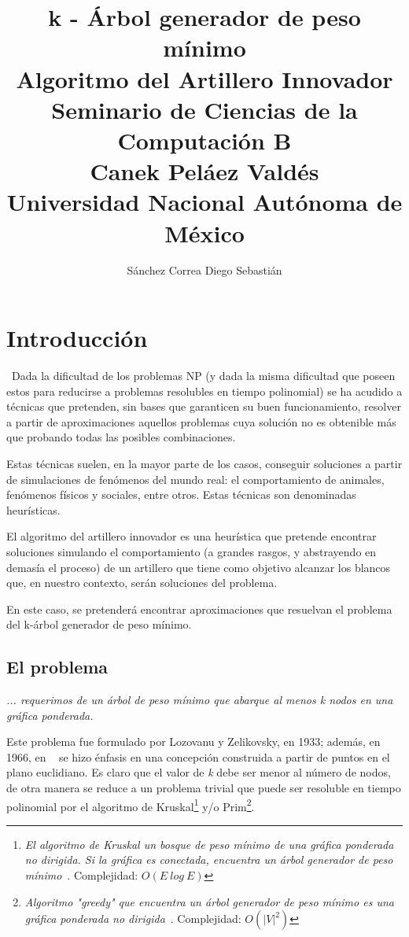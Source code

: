 \documentclass[a4paper]{report}
\title {\textbf {\Large{k - \'Arbol generador de peso m\'inimo}}\protect\\
  \large{\textbf{Algoritmo del Artillero Innovador}}\protect\\ \vspace{0.4cm}
  \normalsize{\textbf{Seminario de Ciencias de la Computaci\'on B}} \protect\\ \vspace{0.2cm}
  \normalsize{Canek Pel\'aez Vald\'es} \protect\\ \vspace{0.4cm}
  \normalsize{Universidad Nacional Aut\'onoma de M\'exico}}
\date{}
\author{\normalsize Sánchez Correa Diego Sebastián}
\begin{document}
\allowdisplaybreaks
\maketitle

\chapter{Introducci\'on}\
Dada la dificultad de los problemas NP (y dada la misma dificultad que poseen estos para
reducirse a problemas resolubles en tiempo polinomial) se ha acudido a t\'ecnicas que
pretenden, sin bases que garanticen su buen funcionamiento, resolver a partir de
aproximaciones aquellos problemas cuya soluci\'on no es obtenible m\'as que probando
todas las posibles combinaciones.

Estas t\'ecnicas suelen, en la mayor parte de los casos, conseguir soluciones a partir
de simulaciones de fen\'omenos del mundo real: el comportamiento de animales, fen\'omenos
f\'isicos y sociales, entre otros. Estas t\'ecnicas son denominadas heur\'isticas.

El algoritmo del artillero innovador es una heur\'istica que pretende encontrar soluciones
simulando el comportamiento (a grandes rasgos, y abstrayendo en demas\'ia el proceso)
de un artillero que tiene como objetivo alcanzar los blancos que, en nuestro contexto,
ser\'an soluciones del problema.

En este caso, se pretender\'a encontrar aproximaciones que resuelvan el problema del
k-\'arbol generador de peso m\'inimo.


\section{El problema}

\begin{center}
  \textit{... requerimos de un \'arbol de peso m\'inimo que abarque al menos k nodos
  en una gr\'afica ponderada. ~\cite{ravi}}
\end{center}
Este problema fue formulado por Lozovanu y Zelikovsky, en 1933; adem\'as, en 1966,
en ~\cite{ravi} se hizo \'enfasis en una concepci\'on construida a partir de puntos en
el plano euclidiano. Es claro que el valor de \textit{k} debe ser menor al n\'umero
de nodos, de otra manera se reduce a un problema trivial que puede ser resoluble
en tiempo polinomial por el algoritmo de Kruskal\footnote{\textit{El algoritmo de Kruskal
    un bosque de peso m\'inimo de una gr\'afica ponderada no dirigida. Si la gr\'afica
    es conectada, encuentra un \'arbol generador de peso m\'inimo}~\cite{kruskal}.
  Complejidad: $O(E \ log \ E)$} y/o Prim\footnote{\textit{Algoritmo "greedy" que encuentra
    un \'arbol generador de peso m\'inimo es una gr\'afica ponderada no dirigida}~\cite{prim}.
  Complejidad: $O(|V|^2)$}.
\end{document}
